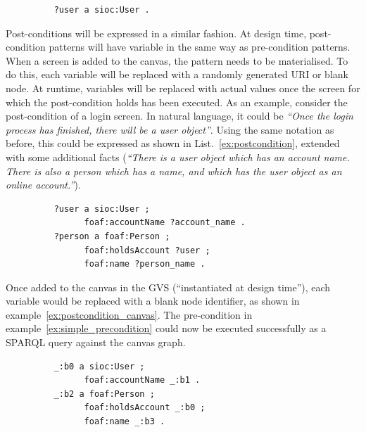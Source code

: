 \documentclass{fast_latex}
\begin{document}
\singlespacing
{}
\begin{figure}[ht]
\begin{lstlisting}
	?user a sioc:User .
\end{lstlisting}
\end{figure}
\doublespacing

Post-conditions will be expressed in a similar fashion. At design time, post-condition patterns will have variable in the same way as pre-condition patterns. When a screen is added to the canvas, the pattern needs to be materialised. To do this, each variable will be replaced with a randomly generated URI or blank node. At runtime, variables will be replaced with actual values once the screen for which the post-condition holds has been executed. As an example, consider the post-condition of a login screen. In natural language, it could be \emph{``Once the login process has finished, there will be a user object''}. Using the same notation as before, this could be expressed as shown in List.~\ref{ex:postcondition}, extended with some additional facts (\emph{``There is a user object which has an account name. There is also a person which has a name, and which has the user object as an online account.''}).

\singlespacing
{}
\begin{figure}[ht]
\begin{lstlisting}
	?user a sioc:User ;
	      foaf:accountName ?account_name .
	?person a foaf:Person ;
	      foaf:holdsAccount ?user ;
	      foaf:name ?person_name .
\end{lstlisting}
\end{figure}
\doublespacing

Once added to the canvas in the GVS (``instantiated at design time''), each variable would be replaced with a blank node identifier, as shown in example~\ref{ex:postcondition_canvas}. The pre-condition in example~\ref{ex:simple_precondition} could now be executed successfully as a SPARQL query against the canvas graph.

\singlespacing
{}
\begin{figure}[ht]
\begin{lstlisting}
	_:b0 a sioc:User ;
	      foaf:accountName _:b1 .
	_:b2 a foaf:Person ;
	      foaf:holdsAccount _:b0 ;
	      foaf:name _:b3 .
\end{lstlisting}
\end{figure}
\doublespacing
\end{document}
